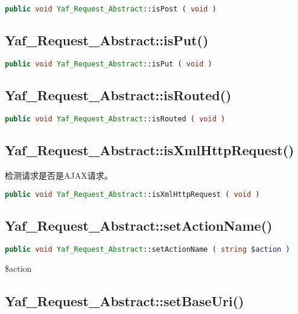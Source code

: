 \begin{lstlisting}[language=PHP]
public void Yaf_Request_Abstract::isPost ( void )
\end{lstlisting}

\subsection{Yaf\_Request\_Abstract::isPut()}

\begin{lstlisting}[language=PHP]
public void Yaf_Request_Abstract::isPut ( void )
\end{lstlisting}


\subsection{Yaf\_Request\_Abstract::isRouted()}

\begin{lstlisting}[language=PHP]
public void Yaf_Request_Abstract::isRouted ( void )
\end{lstlisting}

\subsection{Yaf\_Request\_Abstract::isXmlHttpRequest()}

检测请求是否是AJAX请求。

\begin{lstlisting}[language=PHP]
public void Yaf_Request_Abstract::isXmlHttpRequest ( void )
\end{lstlisting}


\subsection{Yaf\_Request\_Abstract::setActionName()}

\begin{lstlisting}[language=PHP]
public void Yaf_Request_Abstract::setActionName ( string $action )
\end{lstlisting}

\begin{compactitem}
\item \$action
\end{compactitem}



\subsection{Yaf\_Request\_Abstract::setBaseUri()}

